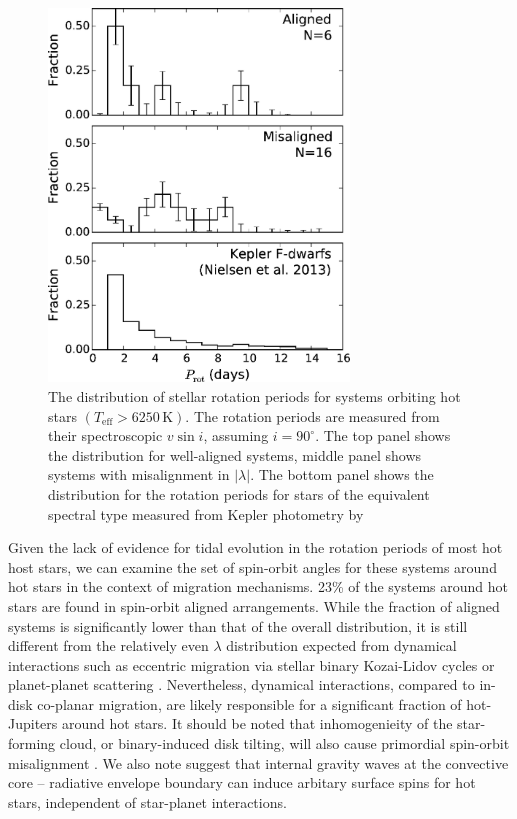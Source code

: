 \documentclass[useAMS,usenatbib]{mn2e}
\begin{document}
\begin{figure}
  \includegraphics[width=8cm]{plots/prot_hist.eps}
  
  \caption{\label{fig:prot_hist}The distribution of stellar rotation periods for systems orbiting hot stars $(T_\text{eff}>6250\,\text{K})$. The rotation periods are measured from their spectroscopic $v\sin i$, assuming $i=90^\circ$. The top panel shows the distribution for well-aligned systems, middle panel shows systems with misalignment in $|\lambda|$. The bottom panel shows the distribution for the rotation periods for stars of the equivalent spectral type measured from Kepler photometry by \citet{2013A&amp;A...557L..10N}}
\end{figure}

Given the lack of evidence for tidal evolution in the rotation periods of most hot host stars, we can examine the set of spin-orbit angles for these systems around hot stars in the context of migration mechanisms. 23\% of the systems around hot stars are found in spin-orbit aligned arrangements. While the fraction of aligned systems is significantly lower than that of the overall distribution, it is still different from the relatively even $\lambda$ distribution expected from dynamical interactions such as eccentric migration via stellar binary Kozai-Lidov cycles \citep[e.g.][]{2012ApJ...754L..36N,2015ApJ...799...27P} or planet-planet scattering \citep[e.g.][]{2011ApJ...742...72N}. Nevertheless, dynamical interactions, compared to in-disk co-planar migration, are likely responsible for a significant fraction of hot-Jupiters around hot stars. It should be noted that inhomogenieity of the star-forming cloud, or binary-induced disk tilting, will also cause primordial spin-orbit misalignment \citep{2010MNRAS.401.1505B,2012Natur.491..418B}. We also note \citet{2012ApJ...758L...6R} suggest that internal gravity waves at the convective core -- radiative envelope boundary can induce arbitary surface spins for hot stars, independent of star-planet interactions.
\end{document}
